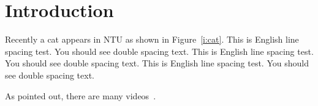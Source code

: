 \chapter{Introduction}
\label{c:intro}

Recently a cat appears in NTU as shown in Figure~\ref{i:cat}.
This is English line spacing test. You should see double spacing text.
This is English line spacing test. You should see double spacing text.
This is English line spacing test. You should see double spacing text.



As \cite{o2014cats} pointed out, there are many videos~\citep{o2014cats}.
